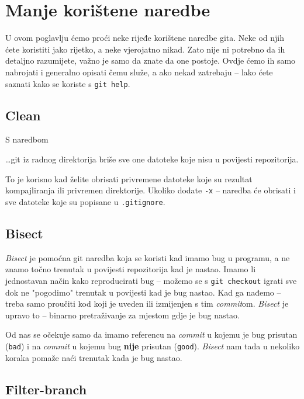 \chapter*{Manje korištene naredbe}

U ovom poglavlju ćemo proći neke rijeđe korištene naredbe gita.
Neke od njih ćete koristiti jako rijetko, a neke vjerojatno nikad.
Zato nije ni potrebno da ih detaljno razumijete, važno je samo da znate da one postoje. 
Ovdje ćemo ih samo nabrojati i generalno opisati čemu služe, a ako nekad zatrebaju -- lako ćete saznati kako se koriste s \verb+git help+.

\section*{Clean}

S naredbom\do\TODO


\dots{}git iz radnog direktorija briše sve one datoteke koje nisu u povijesti repozitorija.

To je korisno kad želite obrisati privremene datoteke koje su rezultat kompajliranja ili privremen direktorije.
Ukoliko dodate \verb+-x+ -- naredba će obrisati i sve datoteke koje su popisane u \verb+.gitignore+.

\section*{Bisect}

\emph{Bisect} je pomoćna git naredba koja se koristi kad imamo bug u programu, a ne znamo točno trenutak u povijesti repozitorija kad je nastao.
Imamo li jednostavan način kako reproducirati bug -- možemo se s \verb+git checkout+ igrati sve dok ne "pogodimo" trenutak u povijesti kad je bug nastao. 
Kad ga nađemo -- treba samo proučiti kod koji je uveden ili izmijenjen s tim \emph{commit}om.
\emph{Bisect} je upravo to -- binarno pretraživanje za mjestom gdje je bug nastao.

Od nas se očekuje samo da imamo referencu na \emph{commit} u kojemu je bug prisutan (\verb+bad+) i na \emph{commit} u kojemu bug \textbf{nije} prisutan (\verb+good+).
\emph{Bisect} nam tada u nekoliko koraka pomaže naći trenutak kada je bug nastao.

\section*{Filter-branch}

